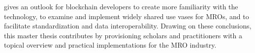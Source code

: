 \citet{efthymiou} gives an outlook for blockchain developers to create more familiarity with the technology, to examine and implement widely shared use vases for MROs, and to facilitate standardization and data interoperability. Drawing on these conclusions, this master thesis contributes by provisioning scholars and practitioners with a topical overview and practical implementations for the MRO industry.

